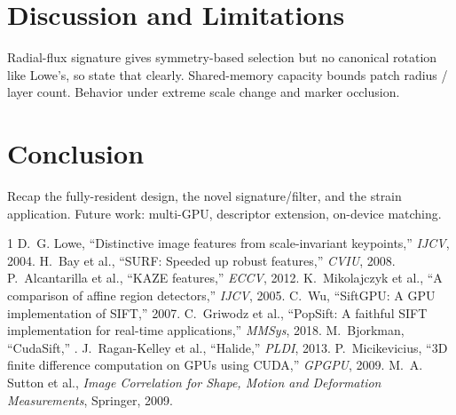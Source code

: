 \section{Discussion and Limitations}
\label{sec:discussion}
\begin{fillbox}
Radial-flux signature gives symmetry-based selection but no canonical rotation
like Lowe's, so state that clearly. Shared-memory capacity bounds patch radius / layer
count. Behavior under extreme scale change and marker occlusion.
\end{fillbox}

\section{Conclusion}
\label{sec:conclusion}
\begin{fillbox}
Recap the fully-resident design, the novel signature/filter, and the strain
application. Future work: multi-GPU, descriptor extension, on-device matching.
\end{fillbox}

\begin{thebibliography}{1}
 D.~G. Lowe, ``Distinctive image features from scale-invariant keypoints,'' \emph{IJCV}, 2004.
 H.~Bay et al., ``SURF: Speeded up robust features,'' \emph{CVIU}, 2008.
 P.~Alcantarilla et al., ``KAZE features,'' \emph{ECCV}, 2012.
 K.~Mikolajczyk et al., ``A comparison of affine region detectors,'' \emph{IJCV}, 2005.
 C.~Wu, ``SiftGPU: A GPU implementation of SIFT,'' 2007.
 C.~Griwodz et al., ``PopSift: A faithful SIFT implementation for real-time applications,'' \emph{MMSys}, 2018.
 M.~Bjorkman, ``CudaSift,'' .
 J.~Ragan-Kelley et al., ``Halide,'' \emph{PLDI}, 2013.
 P.~Micikevicius, ``3D finite difference computation on GPUs using CUDA,'' \emph{GPGPU}, 2009.
 
 M.~A. Sutton et al., \emph{Image Correlation for Shape, Motion and Deformation Measurements}, Springer, 2009.
\end{thebibliography}
